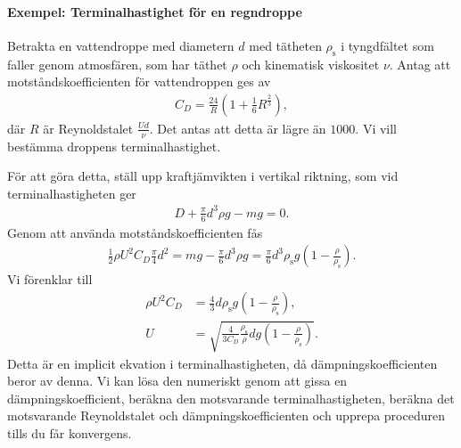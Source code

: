 \paragraph{Exempel: Terminalhastighet för en regndroppe}
Betrakta en vattendroppe med diametern $d$ med tätheten $\rho_{\text{s}}$ i tyngdfältet som faller genom atmosfären, som har täthet $\rho$ och kinematisk viskositet $\nu$. Antag att motståndskoefficienten för vattendroppen ges av
\begin{align*}
	C_{D} = \frac{24}{R}\left(1 + \frac{1}{6}R^{\frac{2}{3}}\right),
\end{align*}
där $R$ är Reynoldstalet $\frac{Ud}{\nu}$. Det antas att detta är lägre än $1000$. Vi vill bestämma droppens terminalhastighet.

För att göra detta, ställ upp kraftjämvikten i vertikal riktning, som vid terminalhastigheten ger
\begin{align*}
	D + \frac{\pi}{6}d^{3}\rho g - mg = 0.
\end{align*}
Genom att använda motståndskoefficienten fås
\begin{align*}
	\frac{1}{2}\rho U^{2}C_{D}\frac{\pi}{4}d^{2} = mg - \frac{\pi}{6}d^{3}\rho g = \frac{\pi}{6}d^{3}\rho_{\text{s}}g\left(1 - \frac{\rho}{\rho_{\text{s}}}\right).
\end{align*}
Vi förenklar till
\begin{align*}
	\rho U^{2}C_{D} &= \frac{4}{3}d\rho_{\text{s}}g\left(1 - \frac{\rho}{\rho_{\text{s}}}\right), \\
	U               &= \sqrt{\frac{4}{3C_{D}}\frac{\rho_{\text{s}}}{\rho}dg\left(1 - \frac{\rho}{\rho_{\text{s}}}\right)}.
\end{align*}
Detta är en implicit ekvation i terminalhastigheten, då dämpningskoefficienten beror av denna. Vi kan lösa den numeriskt genom att gissa en dämpningskoefficient, beräkna den motsvarande terminalhastigheten, beräkna det motsvarande Reynoldstalet och dämpningskoefficienten och upprepa proceduren tills du får konvergens.